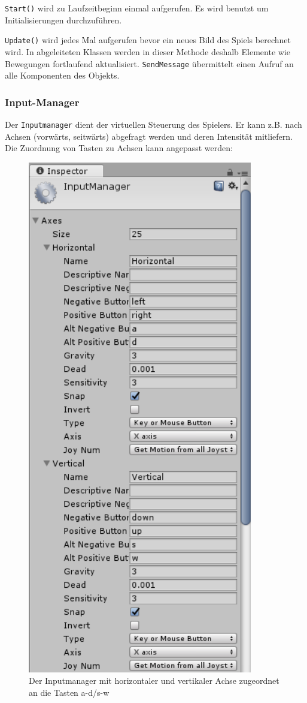 \lstinline{Start()} wird zu Laufzeitbeginn einmal aufgerufen.
Es wird benutzt um Initialisierungen durchzuführen.

\lstinline{Update()} wird jedes Mal aufgerufen bevor ein neues Bild des Spiels berechnet wird. In abgeleiteten Klassen werden in dieser Methode deshalb Elemente wie Bewegungen fortlaufend aktualisiert.
\lstinline{SendMessage} übermittelt einen Aufruf an alle Komponenten des Objekts.

\subsubsection{Input-Manager}

Der \lstinline{Inputmanager} dient der virtuellen Steuerung des Spielers. Er kann z.B. nach Achsen (vorwärts, seitwärts) abgefragt werden und deren Intensität mitliefern.
Die Zuordnung von Tasten zu Achsen kann angepasst werden:

\begin{figure}[H]
\includegraphics[scale=0.67]{screenshots/inputaxis.png}
\caption{Der Inputmanager mit horizontaler und vertikaler Achse zugeordnet an die Tasten a-d/s-w}
\end{figure}

